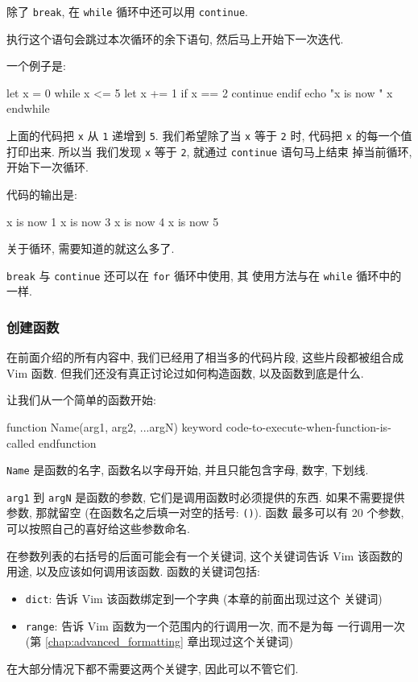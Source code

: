 除了 \texttt{break}, 在 \texttt{while} 循环中还可以用 \texttt{continue}.

执行这个语句会跳过本次循环的余下语句, 然后马上开始下一次迭代.

一个例子是:
\begin{vimcode}
let x = 0
while x <= 5
    let x += 1
    if x ==  2
        continue
    endif
    echo "x is now " x
endwhile
\end{vimcode}
上面的代码把 \texttt{x} 从 \texttt{1} 递增到 \texttt{5}. 我们希望除了当
\texttt{x} 等于 \texttt{2} 时, 代码把 \texttt{x} 的每一个值打印出来. 所以当
我们发现 \texttt{x} 等于 \texttt{2}, 就通过 \texttt{continue} 语句马上结束
掉当前循环, 开始下一次循环.

代码的输出是:
\begin{vimcode}
x is now 1
x is now 3
x is now 4
x is now 5
\end{vimcode}
关于循环, 需要知道的就这么多了.

\begin{warning}
    \texttt{break} 与 \texttt{continue} 还可以在 \texttt{for} 循环中使用, 其
    使用方法与在 \texttt{while} 循环中的一样.
\end{warning}

\subsubsection{创建函数}
\label{subsubsec:creating_functions}

在前面介绍的所有内容中, 我们已经用了相当多的代码片段, 这些片段都被组合成 Vim
函数. 但我们还没有真正讨论过如何构造函数, 以及函数到底是什么.

让我们从一个简单的函数开始:
\begin{vimcode}
function Name(arg1, arg2, ...argN) keyword
    code-to-execute-when-function-is-called
endfunction
\end{vimcode}
\texttt{Name} 是函数的名字, 函数名以字母开始, 并且只能包含字母, 数字, 下划线.

\texttt{arg1} 到 \texttt{argN} 是函数的参数, 它们是调用函数时必须提供的东西.
如果不需要提供参数, 那就留空 (在函数名之后填一对空的括号: \texttt{()}). 函数
最多可以有 20 个参数, 可以按照自己的喜好给这些参数命名.

在参数列表的右括号的后面可能会有一个关键词, 这个关键词告诉 Vim 该函数的用途,
以及应该如何调用该函数. 函数的关键词包括:
\begin{itemize}
    \item \texttt{dict}: 告诉 Vim 该函数绑定到一个字典 (本章的前面出现过这个
        关键词)
    \item \texttt{range}: 告诉 Vim 函数为一个范围内的行调用一次, 而不是为每
        一行调用一次 (第 \ref{chap:advanced_formatting} 章出现过这个关键词)
\end{itemize}
在大部分情况下都不需要这两个关键字, 因此可以不管它们.

